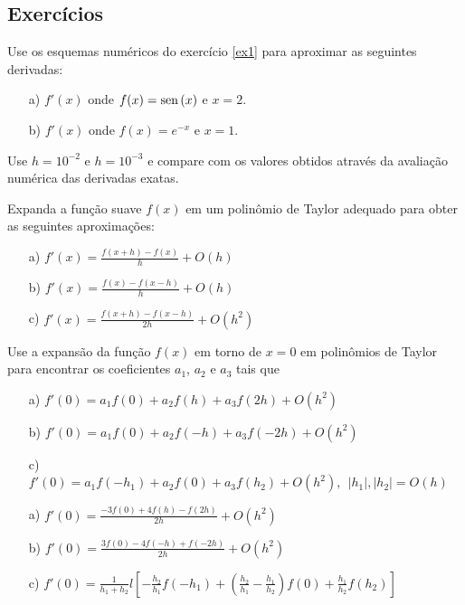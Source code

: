 \subsection*{Exercícios}

\begin{exer}
Use os esquemas numéricos do exercício \ref{ex1} para aproximar as seguintes derivadas:
\begin{itemize}
\item[a)] $f'(x)$ onde $f(x)=\operatorname{sen}\,(x)$ e $x=2$.
\item[b)] $f'(x)$ onde $f(x)=e^{-x}$ e $x=1$.
\end{itemize}
Use $h=10^{-2}$ e $h=10^{-3}$ e compare com os valores obtidos através da avaliação numérica das derivadas exatas.
\end{exer}

\begin{exer}\label{ex1} Expanda a função suave $f(x)$ em um polinômio de Taylor adequado para obter as seguintes aproximações:
\begin{itemize}
\item[a)] $f'(x)=\frac{f(x+h)-f(x)}{h}+O(h)$
\item[b)] $f'(x)=\frac{f(x)-f(x-h)}{h}+O(h)$
\item[c)] $f'(x)=\frac{f(x+h)-f(x-h)}{2h}+O(h^2)$
\end{itemize}
\end{exer}


\begin{exer} Use a expansão da função $f(x)$ em torno de $x=0$ em polinômios de Taylor para encontrar os coeficientes $a_1$, $a_2$ e $a_3$ tais que
\begin{itemize}
\item[a)] $f'(0)=a_1f(0)+a_2f(h)+a_3f(2h) + O(h^2)$
\item[b)] $f'(0)=a_1f(0)+a_2f(-h)+a_3f(-2h) + O(h^2)$
\item[c)] $f'(0)=a_1f(-h_1)+a_2f(0)+a_3f(h_2) + O(h^2),~~|h_1|, |h_2|=O(h)$
\end{itemize}
\end{exer}
\begin{resp}
%  
\begin{itemize}
\item[a)] $f'(0)=\frac{-3f(0)+4f(h)-f(2h)}{2h} + O(h^2)$
\item[b)] $f'(0)=\frac{3f(0)-4f(-h)+f(-2h)}{2h} + O(h^2)$
\item[c)] $f'(0)=\frac{1}{h_1+h_2}l\left[-\frac{h_2}{h_1}f(-h_1) +\left(\frac{h_2}{h_1}-\frac{h_1}{h_2}\right)f(0)+ \frac{h_1}{h_2}f(h_2)\right]$
\end{itemize}    
%  
\end{resp}

